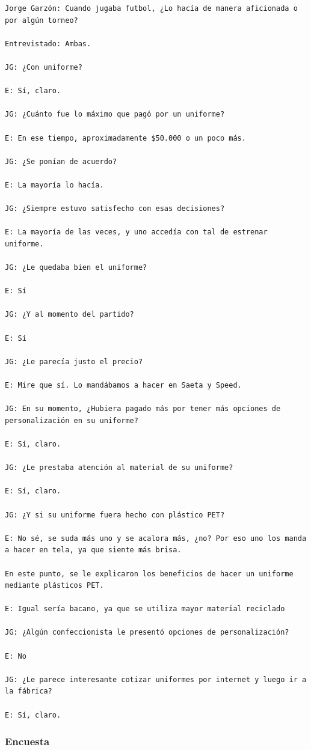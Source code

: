 \documentclass[11pt]{article}
\begin{document}
\begin{verbatim}
Jorge Garzón: Cuando jugaba futbol, ¿Lo hacía de manera aficionada o por algún torneo?

Entrevistado: Ambas.

JG: ¿Con uniforme?

E: Sí, claro.

JG: ¿Cuánto fue lo máximo que pagó por un uniforme?

E: En ese tiempo, aproximadamente $50.000 o un poco más.

JG: ¿Se ponían de acuerdo?

E: La mayoría lo hacía.

JG: ¿Siempre estuvo satisfecho con esas decisiones?

E: La mayoría de las veces, y uno accedía con tal de estrenar uniforme.

JG: ¿Le quedaba bien el uniforme?

E: Sí

JG: ¿Y al momento del partido?

E: Sí

JG: ¿Le parecía justo el precio?

E: Mire que sí. Lo mandábamos a hacer en Saeta y Speed.

JG: En su momento, ¿Hubiera pagado más por tener más opciones de personalización en su uniforme?

E: Sí, claro.

JG: ¿Le prestaba atención al material de su uniforme?

E: Sí, claro.

JG: ¿Y si su uniforme fuera hecho con plástico PET?

E: No sé, se suda más uno y se acalora más, ¿no? Por eso uno los manda a hacer en tela, ya que siente más brisa.

En este punto, se le explicaron los beneficios de hacer un uniforme mediante plásticos PET.

E: Igual sería bacano, ya que se utiliza mayor material reciclado

JG: ¿Algún confeccionista le presentó opciones de personalización?

E: No

JG: ¿Le parece interesante cotizar uniformes por internet y luego ir a la fábrica?

E: Sí, claro.
\end{verbatim}
\subsubsection{Encuesta}
\label{sec:org1cb14e1}
\end{document}
